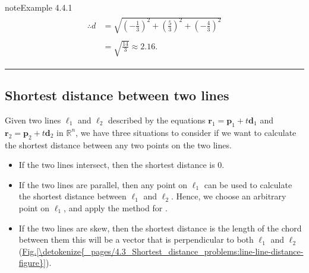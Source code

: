 \documentclass[letterpaper,10pt,english]{jupyterBook}
\begin{document}
\begin{sphinxadmonition}{note}{Example 4.4.1}
\begin{equation*}
\begin{split}
\begin{align*}
    \therefore d &= \sqrt{\left(-\frac{1}{3}\right)^2 + \left(\frac{5}{3}\right)^2 + \left( -\frac{4}{3}\right)^2} \\ \\
    &= \sqrt{\frac{14}{3}} \approx 2.16.
\end{align*} \end{split}
\end{equation*}\end{sphinxadmonition}


\bigskip\hrule\bigskip


\ignorespaces 

\subsection{Shortest distance between two lines}
\label{\detokenize{_pages/4.3_Shortest_distance_problems:shortest-distance-between-two-lines}}\label{\detokenize{_pages/4.3_Shortest_distance_problems:index-3}}
\sphinxAtStartPar
Given two lines \(\ell_1\) and \(\ell_2\) described by the equations \(\mathbf{r}_1 = \mathbf{p}_1 + t \mathbf{d}_1\) and \(\mathbf{r}_2 =  \mathbf{p}_2 + t \mathbf{d}_2\) in \(\mathbb{R}^n\), we have three situations to consider if we want to calculate the shortest distance between any two points on the two lines.
\begin{itemize}
\item {} 
\sphinxAtStartPar
If the two lines intersect, then the shortest distance is 0.

\item {} 
\sphinxAtStartPar
If the two lines are parallel, then any point on \(\ell_1\) can be used to calculate the shortest distance between \(\ell_1\) and \(\ell_2\). Hence, we choose an arbitrary point on \(\ell_1\), and apply the method for {\hyperref[\detokenize{_pages/4.3_Shortest_distance_problems:point-line-distance-theorem}]{}}.

\item {} 
\sphinxAtStartPar
If the two lines are skew, then the shortest distance is the length of the chord between them \sphinxhyphen{} this will be a vector that is perpendicular to both \(\ell_1\) and \(\ell_2\) (\hyperref[\detokenize{_pages/4.3_Shortest_distance_problems:line-line-distance-figure}]{Fig.\@ \ref{\detokenize{_pages/4.3_Shortest_distance_problems:line-line-distance-figure}}}).

\end{itemize}
\end{document}
